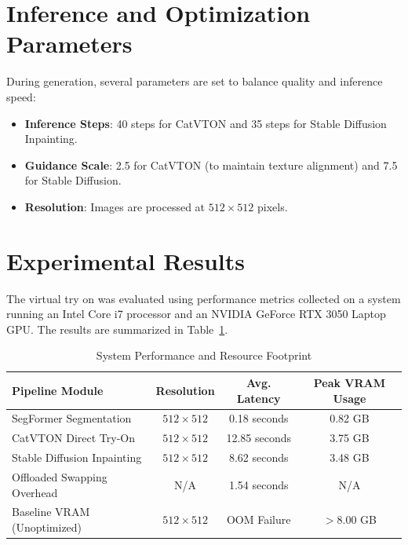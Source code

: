 \documentclass[12pt, a4paper]{report}
\begin{document}
\section{Inference and Optimization Parameters}

During generation, several parameters are set to balance quality and inference speed:
\begin{itemize}
\item \textbf{Inference Steps}: 40 steps for CatVTON and 35 steps for Stable Diffusion Inpainting.
\item \textbf{Guidance Scale}: 2.5 for CatVTON (to maintain texture alignment) and 7.5 for Stable Diffusion.
\item \textbf{Resolution}: Images are processed at $512 \times 512$ pixels.
\end{itemize}

\section{Experimental Results}

The virtual try on was evaluated using performance metrics collected on a system running an Intel Core i7 processor and an NVIDIA GeForce RTX 3050 Laptop GPU. The results are summarized in Table~\ref{tab:results}.

\begin{table}[h]
\centering
\caption{System Performance and Resource Footprint}
\label{tab:results}
\begin{tabular}{|l|c|c|c|}
\hline
\textbf{Pipeline Module} & \textbf{Resolution} & \textbf{Avg. Latency} & \textbf{Peak VRAM Usage} \\ \hline
SegFormer Segmentation & $512 \times 512$ & 0.18 seconds & 0.82 GB \\
CatVTON Direct Try-On & $512 \times 512$ & 12.85 seconds & 3.75 GB \\
Stable Diffusion Inpainting & $512 \times 512$ & 8.62 seconds & 3.48 GB \\
Offloaded Swapping Overhead & N/A & 1.54 seconds & N/A \\
Baseline VRAM (Unoptimized) & $512 \times 512$ & OOM Failure & $> 8.00$ GB \\
\hline
\end{tabular}
\end{table}
\end{document}
